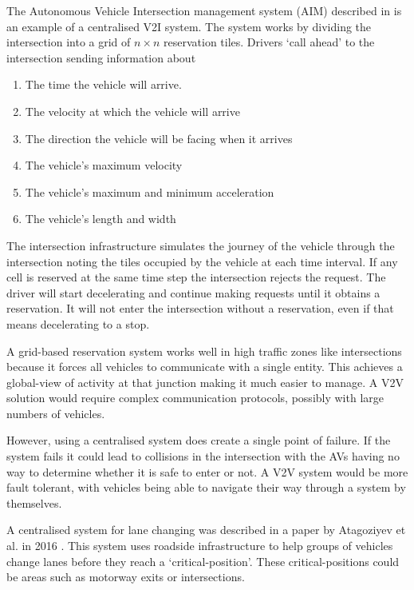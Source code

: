 The Autonomous Vehicle Intersection management system (AIM) described in \citep{Dresner2004} is an example of a centralised V2I system. The system works by dividing the intersection into a grid of $n \times n$ reservation tiles. Drivers `call ahead' to the intersection sending information about

\begin{enumerate}
\item The time the vehicle will arrive.
\item The velocity at which the vehicle will arrive
\item The direction the vehicle will be facing when it arrives
\item The vehicle's maximum velocity
\item The vehicle's maximum and minimum acceleration
\item The vehicle's length and width
\end{enumerate}

The intersection infrastructure simulates the journey of the vehicle through the intersection noting the tiles occupied by the vehicle at each time interval. If any cell is reserved at the same time step the intersection rejects the request. The driver will start decelerating and continue making requests until it obtains a reservation. It will not enter the intersection without a reservation, even if that means decelerating to a stop.


A grid-based reservation system works well in high traffic zones like intersections because it forces all vehicles to communicate with a single entity. This achieves a global-view of activity at that junction making it much easier to manage. A V2V solution would require complex communication protocols, possibly with large numbers of vehicles.

However, using a centralised system does create a single point of failure. If the system fails it could lead to collisions in the intersection with the AVs having no way to determine whether it is safe to enter or not. A V2V system would be more fault tolerant, with vehicles being able to navigate their way through a system by themselves.

A centralised system for lane changing was described in a paper by Atagoziyev et al. in 2016 \citep{Atagoziyev2016}. This system uses roadside infrastructure to help groups of vehicles change lanes before they reach a `critical-position'. These critical-positions could be areas such as motorway exits or intersections.

